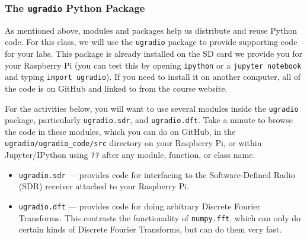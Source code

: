 \documentclass[11pt,preprint]{aastex}
\begin{document}
\subsubsection{The {\tt ugradio} Python Package}

\noindent
As mentioned above, modules and packages help us distribute and reuse 
Python code.
For this class, we will use
the {\tt ugradio} package to provide supporting code for your labs.
This package is already installed on the SD card we provide you for
your Raspberry Pi (you can test this by opening {\tt ipython} or
a {\tt jupyter notebook}
and typing {\tt import ugradio}). If you need to install it on 
another computer, all of the code is on GitHub and linked to from the 
course website.  

For the activities below, you will want to use several modules 
inside the {\tt ugradio} package, particularly {\tt ugradio.sdr},
and {\tt ugradio.dft}.
Take a minute to browse the code in these modules, which you can do
on GitHub, in the {\tt ugradio/ugradio\_code/src} directory on
your Raspberry Pi, or within Jupyter/IPython using {\tt ??} after
any module, function, or class name.

\begin{itemize}


\item {\tt ugradio.sdr} --- provides code for interfacing to the Software-Defined
Radio (SDR) receiver attached to your Raspberry Pi.

\item {\tt ugradio.dft} --- provides code for doing arbitrary Discrete Fourier Transforms.  This
contrasts the functionality of {\tt numpy.fft}, which can only do certain kinds of
Discrete Fourier Transforms, but can do them very fast.



\end{itemize}
\end{document}
